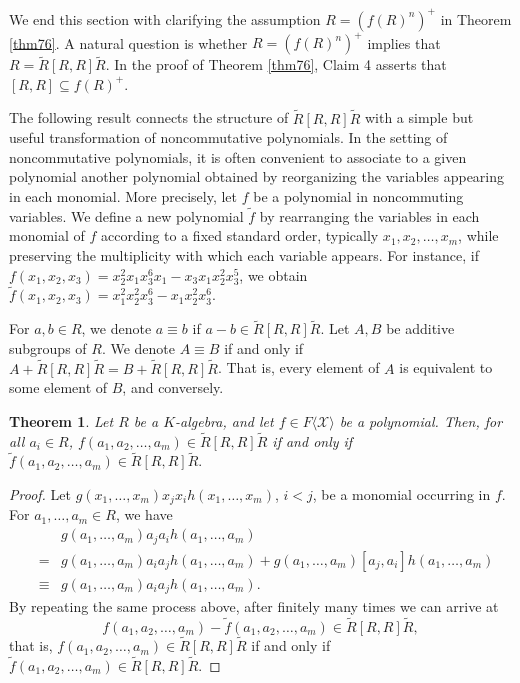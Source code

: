\documentclass[11pt]{article}
\newtheorem{theorem}{Theorem}
\theoremstyle{definition}
\begin{document}
{{{{				We end this section with clarifying the assumption $R=(f(R)^n)^+$ in Theorem \ref{thm76}. A natural question is whether $R=(f(R)^n)^+$ implies that
				$R=\widetilde R[R, R]\widetilde R$.
				In the proof of Theorem \ref{thm76}, Claim 4 asserts that $[R, R]\subseteq f(R)^+$.
				
				The following result connects the structure of $\widetilde{R}[R, R]\widetilde{R}$ with a simple but useful transformation of noncommutative polynomials. In the setting of noncommutative polynomials, it is often convenient to associate to a given polynomial another polynomial obtained by reorganizing the variables appearing in each monomial. More precisely, let $f$ be a polynomial in noncommuting variables. We define a new polynomial $\widetilde{f}$ by rearranging the variables in each monomial of $f$ according to a fixed standard order, typically $x_1, x_2, \ldots, x_m$, while preserving the multiplicity with which each variable appears.  For instance, if $f(x_1, x_2, x_3) = x_2^2 x_1 x_3^6 x_1 - x_3 x_1 x_2^2 x_3^5$, we obtain $\widetilde{f}(x_1, x_2, x_3) = x_1^2 x_2^2 x_3^6 - x_1 x_2^2 x_3^6.$
				
				For $a, b\in R$, we denote $a\equiv b$ if $a-b\in \widetilde{R}[R, R]\widetilde{R}$. Let $A, B$ be additive subgroups of $R$. We denote $A\equiv B$
				if and only if $A+\widetilde{R}[R, R]\widetilde{R}=B+\widetilde{R}[R, R]\widetilde{R}$. That is, every element of $A$ is equivalent to some element of $B$, and conversely.
				
				\begin{theorem}\label{thm51}
					Let $R$ be a $K$-algebra, and let $f \in F\langle \mathcal{X} \rangle$ be a polynomial. Then, for all $a_i \in R$,
					$f(a_1, a_2, \ldots, a_m) \in \widetilde{R}[R, R]\widetilde{R}$ if and only if
					$\widetilde{f}(a_1, a_2, \ldots, a_m) \in \widetilde{R}[R, R]\widetilde{R}.$
				\end{theorem}
				
				\begin{proof}
					Let $g(x_1,\ldots,x_m)x_jx_ih(x_1,\ldots,x_m)$, $i<j$, be a monomial occurring in $f$. For $a_1,\ldots,a_m\in R$, we have
					\begin{eqnarray*}
						&&g(a_1,\ldots,a_m)a_ja_ih(a_1,\ldots,a_m)\\
						&=& g(a_1,\ldots,a_m)a_ia_jh(a_1,\ldots,a_m)+g(a_1,\ldots,a_m)[a_j, a_i]h(a_1,\ldots,a_m) \\
						&\equiv&  g(a_1,\ldots,a_m)a_ia_jh(a_1,\ldots,a_m).
					\end{eqnarray*}
					By repeating the same process above,  after finitely many times we can arrive at $$f(a_1, a_2, \ldots, a_m) - \widetilde{f}(a_1, a_2, \ldots, a_m) \in \widetilde{R}[R, R]\widetilde{R},$$ that is,
					$f(a_1, a_2, \ldots, a_m) \in \widetilde{R}[R, R]\widetilde{R}$ if and only if
					$\widetilde{f}(a_1, a_2, \ldots, a_m) \in \widetilde{R}[R, R]\widetilde{R}.$
				\end{proof}
				

}}}}
\end{document}
